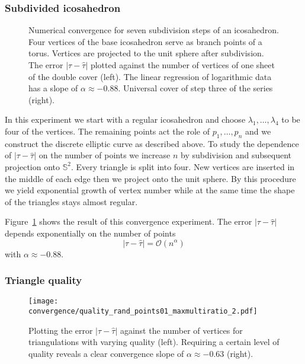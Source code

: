 \documentclass[Thesis.tex]{subfiles}
\begin{document}
\subsubsection{Subdivided icosahedron}

\begin{figure}
\caption{Numerical convergence for seven subdivision steps of an icosahedron.
Four vertices of the base icosahedron serve as branch points of a torus.
Vertices are projected to the unit sphere after subdivision.
The error $|\tau - \hat\tau|$ plotted against the number of vertices of one sheet of the double cover (left).
The linear regression of logarithmic data has a slope of $\alpha\approx-0.88$.
Universal cover of step three of the series (right).
}
\label{fig:convergence_subdivision}
\end{figure}

In this experiment we start with a regular icosahedron and choose $\lambda_1,\ldots,\lambda_4$ to be four of the vertices. The remaining points act the role of $p_1,\ldots,p_n$ and we construct the discrete elliptic curve as described above. To study the dependence of $|\tau-\hat \tau|$ on the number of points we increase $n$ by subdivision and subsequent projection onto $\mathbb S^2$. Every triangle is split into four. New vertices are inserted in the middle of each edge then we project onto the unit sphere. By this procedure we yield exponential growth of vertex number while at the same time the shape of the triangles stays almost regular.

Figure~\ref{fig:convergence_subdivision} shows the result of this convergence experiment. The error $|\tau-\hat \tau|$ depends exponentially on the number of points
\[|\tau-\hat \tau|=\mathcal O (n^\alpha)\]
with $\alpha \approx -0.88$.

\subsubsection{Triangle quality}

\begin{figure}
\texttt{[image: convergence/quality\_rand\_points01\_maxmultiratio\_2.pdf]}
\caption{Plotting the error $|\tau - \hat\tau|$ against the number of vertices for triangulations with varying quality (left). Requiring a certain level of quality reveals a clear convergence slope of $\alpha\approx -0.63$ (right).}
\label{fig:convergence_quality}
\end{figure}
\end{document}
